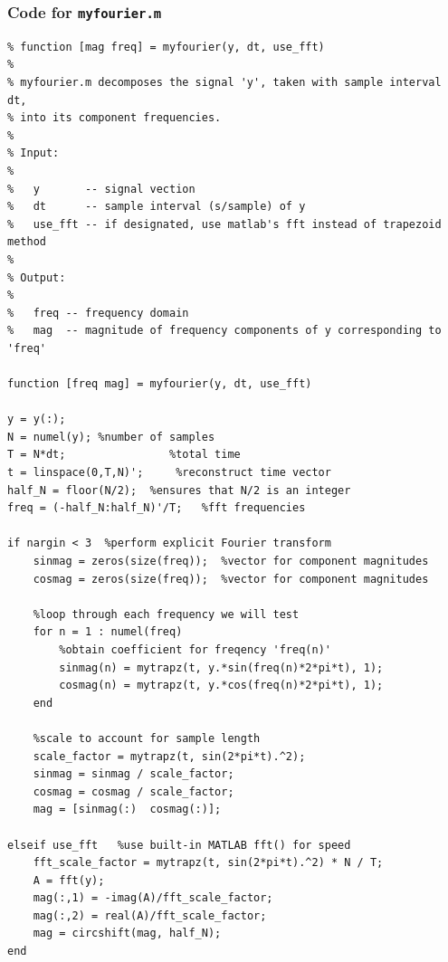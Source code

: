 \documentclass{article}
\begin{document}
\subsubsection*{Code for {\tt myfourier.m}}
\begin{verbatim}
% function [mag freq] = myfourier(y, dt, use_fft)
%
% myfourier.m decomposes the signal 'y', taken with sample interval dt,
% into its component frequencies.
%
% Input:
%
%   y       -- signal vection
%   dt      -- sample interval (s/sample) of y
%   use_fft -- if designated, use matlab's fft instead of trapezoid method
%
% Output:
%
%   freq -- frequency domain
%   mag  -- magnitude of frequency components of y corresponding to 'freq'

function [freq mag] = myfourier(y, dt, use_fft)

y = y(:);
N = numel(y); %number of samples
T = N*dt;                %total time
t = linspace(0,T,N)';     %reconstruct time vector
half_N = floor(N/2);  %ensures that N/2 is an integer
freq = (-half_N:half_N)'/T;   %fft frequencies

if nargin < 3  %perform explicit Fourier transform
    sinmag = zeros(size(freq));  %vector for component magnitudes
    cosmag = zeros(size(freq));  %vector for component magnitudes
    
    %loop through each frequency we will test
    for n = 1 : numel(freq)
        %obtain coefficient for freqency 'freq(n)'
        sinmag(n) = mytrapz(t, y.*sin(freq(n)*2*pi*t), 1);
        cosmag(n) = mytrapz(t, y.*cos(freq(n)*2*pi*t), 1);
    end
    
    %scale to account for sample length
    scale_factor = mytrapz(t, sin(2*pi*t).^2);
    sinmag = sinmag / scale_factor;
    cosmag = cosmag / scale_factor;
    mag = [sinmag(:)  cosmag(:)];
    
elseif use_fft   %use built-in MATLAB fft() for speed
    fft_scale_factor = mytrapz(t, sin(2*pi*t).^2) * N / T;
    A = fft(y);
    mag(:,1) = -imag(A)/fft_scale_factor;
    mag(:,2) = real(A)/fft_scale_factor;
    mag = circshift(mag, half_N);
end
\end{verbatim}
\end{document}
